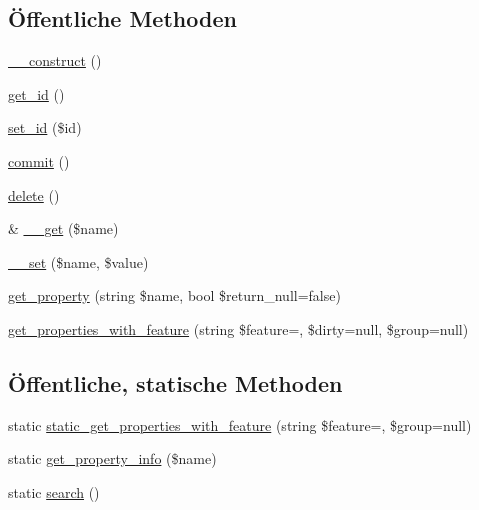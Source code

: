 \subsection*{Öffentliche Methoden}
\begin{DoxyCompactItemize}
\item 
\hyperlink{classSunhill_1_1propertieshaving_a69da40ae99f4c28cbe1292ef21e829cd}{\+\_\+\+\_\+construct} ()
\item 
\hyperlink{classSunhill_1_1propertieshaving_aecbff22fc3e0d9767d699e7cc60e6cfe}{get\+\_\+id} ()
\item 
\hyperlink{classSunhill_1_1propertieshaving_a0edc666d2e4bb18df1cdfa66307890de}{set\+\_\+id} (\$id)
\item 
\hyperlink{classSunhill_1_1propertieshaving_a18341af02ecfc8f094bcc681b91c6cce}{commit} ()
\item 
\hyperlink{classSunhill_1_1propertieshaving_aee8126e25750c5e62a04ed3e66fecdc0}{delete} ()
\item 
\& \hyperlink{classSunhill_1_1propertieshaving_ae8ca869ba942b1d32df0be253dca1975}{\+\_\+\+\_\+get} (\$name)
\item 
\hyperlink{classSunhill_1_1propertieshaving_a077b7b7b5b9e81b60b69da870761a25b}{\+\_\+\+\_\+set} (\$name, \$value)
\item 
\hyperlink{classSunhill_1_1propertieshaving_aaec22fdd6b0fd4e82e3b0b3c54bc28a1}{get\+\_\+property} (string \$name, bool \$return\+\_\+null=false)
\item 
\hyperlink{classSunhill_1_1propertieshaving_a31b03c95e2835f0a21012da3a6e97b06}{get\+\_\+properties\+\_\+with\+\_\+feature} (string \$feature=\textquotesingle{}\textquotesingle{}, \$dirty=null, \$group=null)
\end{DoxyCompactItemize}
\subsection*{Öffentliche, statische Methoden}
\begin{DoxyCompactItemize}
\item 
static \hyperlink{classSunhill_1_1propertieshaving_aa4947bfef734b843168b2e9c6fa7198a}{static\+\_\+get\+\_\+properties\+\_\+with\+\_\+feature} (string \$feature=\textquotesingle{}\textquotesingle{}, \$group=null)
\item 
static \hyperlink{classSunhill_1_1propertieshaving_a44d5d98c959487f6118e92372104e596}{get\+\_\+property\+\_\+info} (\$name)
\item 
static \hyperlink{classSunhill_1_1propertieshaving_a90e24a5043e9b071197f02e462b73b93}{search} ()
\end{DoxyCompactItemize}
